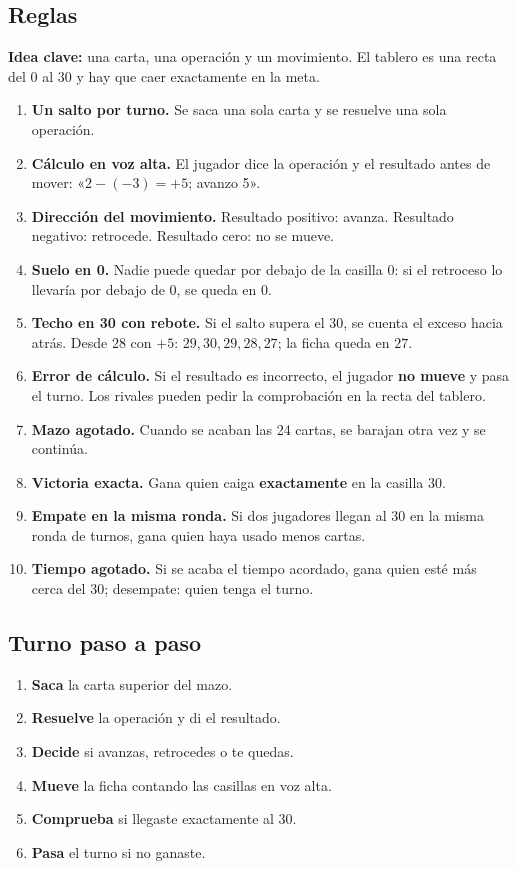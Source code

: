 \documentclass[12pt, letterpaper]{article}
\begin{document}
\subsection{Reglas}

\textbf{Idea clave:} una carta, una operación y un movimiento. El tablero es una recta del $0$ al $30$ y hay que caer exactamente en la meta.

\begin{enumerate}[leftmargin=*]
  \item \textbf{Un salto por turno.} Se saca una sola carta y se resuelve una sola operación.
  \item \textbf{Cálculo en voz alta.} El jugador dice la operación y el resultado antes de mover: «$2-(-3)=+5$; avanzo 5».
  \item \textbf{Dirección del movimiento.} Resultado positivo: avanza. Resultado negativo: retrocede. Resultado cero: no se mueve.
  \item \textbf{Suelo en 0.} Nadie puede quedar por debajo de la casilla $0$: si el retroceso lo llevaría por debajo de $0$, se queda en $0$.
  \item \textbf{Techo en 30 con rebote.} Si el salto supera el $30$, se cuenta el exceso hacia atrás. Desde $28$ con $+5$: $29, 30, 29, 28, 27$; la ficha queda en $27$.
  \item \textbf{Error de cálculo.} Si el resultado es incorrecto, el jugador \textbf{no mueve} y pasa el turno. Los rivales pueden pedir la comprobación en la recta del tablero.
  \item \textbf{Mazo agotado.} Cuando se acaban las 24 cartas, se barajan otra vez y se continúa.
  \item \textbf{Victoria exacta.} Gana quien caiga \textbf{exactamente} en la casilla $30$.
  \item \textbf{Empate en la misma ronda.} Si dos jugadores llegan al $30$ en la misma ronda de turnos, gana quien haya usado menos cartas.
  \item \textbf{Tiempo agotado.} Si se acaba el tiempo acordado, gana quien esté más cerca del $30$; desempate: quien tenga el turno.
\end{enumerate}

\subsection{Turno paso a paso}

\begin{enumerate}[leftmargin=*]
  \item \textbf{Saca} la carta superior del mazo.
  \item \textbf{Resuelve} la operación y di el resultado.
  \item \textbf{Decide} si avanzas, retrocedes o te quedas.
  \item \textbf{Mueve} la ficha contando las casillas en voz alta.
  \item \textbf{Comprueba} si llegaste exactamente al $30$.
  \item \textbf{Pasa} el turno si no ganaste.
\end{enumerate}
\end{document}
